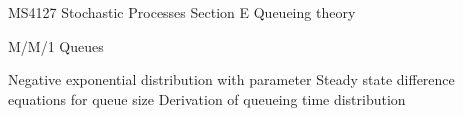 MS4127 Stochastic Processes Section E
Queueing theory
 
M/M/1 Queues
 
Negative exponential distribution with parameter 
Steady state difference equations for queue size
Derivation of queueing time distribution
